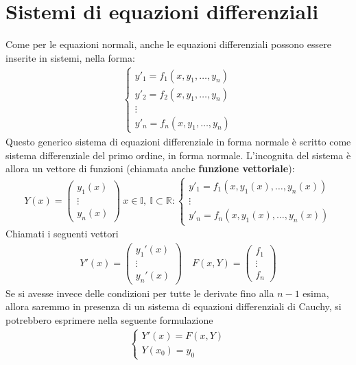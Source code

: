 \documentclass[a4paper, oneside]{book}
\begin{document}
\clearpage
\section{Sistemi di equazioni differenziali}
Come per le equazioni normali, anche le equazioni differenziali possono
essere inserite in sistemi, nella forma:
\begin{gather*}
    \left\{\begin{array}{l}
        y'_1 = f_1(x, y_1, \dots, y_n) \\
        y'_2 = f_2(x, y_1, \dots, y_n) \\
        \vdots \\
        y'_n = f_n(x, y_1, \dots, y_n)
    \end{array}\right.
\end{gather*}
Questo generico sistema di equazioni differenziale in forma normale è scritto come
sistema differenziale del primo ordine, in forma normale. 
L'incognita del sistema è allora un vettore di funzioni (chiamata anche \textbf{funzione vettoriale}):
\begin{gather*}
    Y(x) = \begin{pmatrix} y_1(x) \\
    \vdots \\
    y_n(x) \end{pmatrix} \  x \in \mathbb{I}, \ \mathbb{I} \subset \mathbb{R} :
    \left\{\begin{array}{l}
        y'_1 = f_1(x, y_1(x), \dots, y_n(x)) \\
        \vdots  \\
        y'_n = f_n(x, y_1(x), \dots, y_n(x)) 
    \end{array}\right.
\end{gather*}
Chiamati i seguenti vettori
\begin{gather*}
        Y'(x) = \begin{pmatrix}
        y_1'(x) \\
        \vdots \\
        y_n'(x)
    \end{pmatrix} 
    \quad 
    F(x, Y) = \begin{pmatrix}
        f_1 \\
        \vdots \\
        f_n
    \end{pmatrix}
\end{gather*}
Se si avesse invece delle condizioni
per tutte le derivate fino alla $n - 1$ esima, allora saremmo in presenza di un
sistema di equazioni differenziali di Cauchy, si potrebbero esprimere
nella seguente formulazione
\begin{gather*}
    \left\{\begin{array}{l}
        Y'(x) = F(x, Y) \\
        Y(x_0) = y_0
    \end{array}\right.
\end{gather*}
\end{document}
